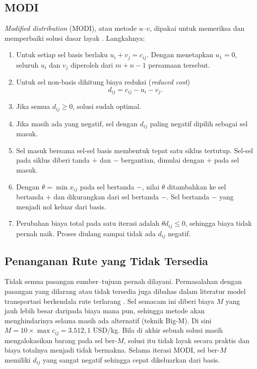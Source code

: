 \documentclass[a4paper,11pt]{article}
\begin{document}
\subsection{MODI}
\textit{Modified distribution} (MODI), atau metode $u$--$v$, dipakai untuk memeriksa dan memperbaiki solusi dasar layak \cite{harrath2018,karagul2020}. Langkahnya:
\begin{enumerate}
  \item Untuk setiap sel basis berlaku $u_i + v_j = c_{ij}$. Dengan menetapkan $u_1 = 0$, seluruh $u_i$ dan $v_j$ diperoleh dari $m+n-1$ persamaan tersebut.
  \item Untuk sel non-basis dihitung biaya reduksi (\textit{reduced cost})
  \begin{equation}
  d_{ij} = c_{ij} - u_i - v_j. \label{eq:red}
  \end{equation}
  \item Jika semua $d_{ij} \ge 0$, solusi sudah optimal.
  \item Jika masih ada yang negatif, sel dengan $d_{ij}$ paling negatif dipilih sebagai sel masuk.
  \item Sel masuk bersama sel-sel basis membentuk tepat satu siklus tertutup. Sel-sel pada siklus diberi tanda $+$ dan $-$ bergantian, dimulai dengan $+$ pada sel masuk.
  \item Dengan $\theta = \min x_{ij}$ pada sel bertanda $-$, nilai $\theta$ ditambahkan ke sel bertanda $+$ dan dikurangkan dari sel bertanda $-$. Sel bertanda $-$ yang menjadi nol keluar dari basis.
  \item Perubahan biaya total pada satu iterasi adalah $\theta d_{ij} \le 0$, sehingga biaya tidak pernah naik. Proses diulang sampai tidak ada $d_{ij}$ negatif.
\end{enumerate}

\subsection{Penanganan Rute yang Tidak Tersedia}
Tidak semua pasangan sumber--tujuan pernah dilayani. Permasalahan dengan pasangan yang dilarang atau tidak tersedia juga dibahas dalam literatur model transportasi berkendala rute terlarang \cite{ackoraprah2022}. Sel semacam ini diberi biaya $M$ yang jauh lebih besar daripada biaya mana pun, sehingga metode akan menghindarinya selama masih ada alternatif (teknik Big-M). Di sini $M = 10 \times \max c_{ij} = 3.512{,}1$ USD/kg. Bila di akhir sebuah solusi masih mengalokasikan barang pada sel ber-$M$, solusi itu tidak layak secara praktis dan biaya totalnya menjadi tidak bermakna. Selama iterasi MODI, sel ber-$M$ memiliki $d_{ij}$ yang sangat negatif sehingga cepat dikeluarkan dari basis.
\end{document}
